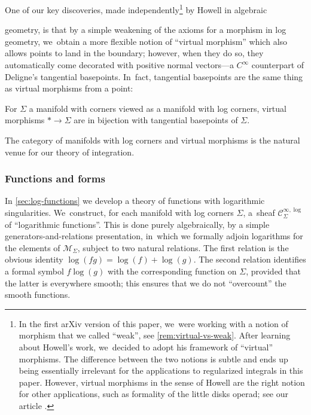 \documentclass[10pt]{amsart}
\theoremstyle{definition}
\theoremstyle{remark}
\newcommand{\cM}{\mathscr{M}}
\newcommand{\Cinflog}[1]{\mathscr{C}^{\infty,\log}_{#1}}
\newcommand{\Sig}{\Sigma}
\begin{document}
One of our key discoveries, made independently\footnote{In the first arXiv version of this paper, we~were working with a notion of morphism that we called ``weak'', see \autoref{rem:virtual-vs-weak}. After learning about Howell's work, we~decided to adopt his framework of ``virtual'' morphisms. The difference between the two notions is subtle and ends up being essentially irrelevant for the applications to regularized integrals in this paper. However, virtual morphisms in the sense of Howell are the right notion for other applications, such as formality of the little disks operad; see our article \cite{DPP:WeakMorphisms}.} by Howell \cite{Howell2017} in algebraic

\noindent
geometry, is that by a simple weakening of the axioms for a morphism in log geometry, we~obtain a more flexible notion of ``virtual morphism'' which also allows points to land in the boundary; however, when they do so, they automatically come decorated with positive normal vectors---a $C^\infty$ counterpart of Deligne's tangential basepoints. In~fact, tangential basepoints are the same thing as virtual morphisms from a point:

\begin{proposition}
For $\Sig$ a manifold with corners viewed as a manifold with log corners, virtual morphisms $*\to \Sig$ are in bijection with tangential basepoints of $\Sig$.
\end{proposition}

The category of manifolds with log corners and virtual morphisms is the natural venue for our theory of integration.

\subsubsection{Functions and forms}

In \autoref{sec:log-functions} we develop a theory of functions with logarithmic singularities. We~construct, for each manifold with log corners $\Sig$, a~sheaf $\Cinflog{\Sig}$ of ``logarithmic functions''. This is done purely algebraically, by a simple generators-and-relations presentation, in~which we formally adjoin logarithms for the elements of $\cM_\Sig$, subject to two natural relations. The first relation is the obvious identity $\log(fg) = \log(f)+\log(g)$. The second relation identifies a formal symbol $f \log(g)$ with the corresponding function on $\Sig$, provided that the latter is everywhere smooth; this ensures that we do not ``overcount'' the smooth functions.
\end{document}
